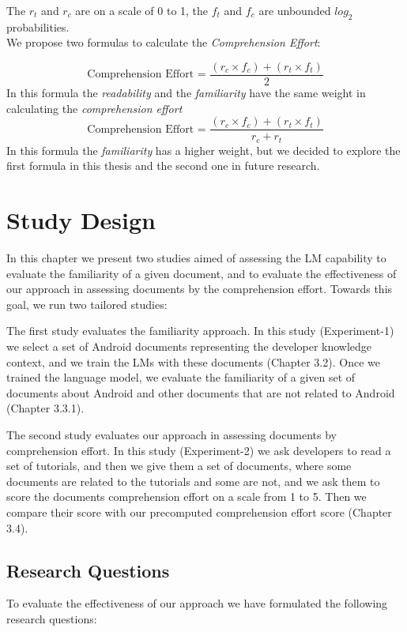 \documentclass[12pt,mscthesis]{usiinfthesis}
\begin{document}
 The $r_{t}$  and $r_{c}$ are on a scale of 0 to 1,  the $f_{t}$  and $f_{c}$ are unbounded $log_{2}$ probabilities.\\
 We propose two formulas to calculate the \emph{Comprehension Effort}:

 \[\text{Comprehension Effort = }\frac{(r_{c}\times f_{c}) + (r_{t} \times f_{t})}{2} \]
 In this formula the \emph{readability} and the \emph{familiarity} have the same weight in calculating the \emph{comprehension effort}
 \[\text{Comprehension Effort = }\frac{(r_{c}\times f_{c}) + (r_{t} \times f_{t})}{r_c+r_t} \]
 In this formula the \emph{familiarity} has a higher weight, but we decided to explore the first formula in this thesis and the second one in future research.
	
\chapter{Study Design}

	In this chapter we present two studies aimed of assessing the LM capability to evaluate the familiarity of a given document, and to evaluate the effectiveness of our approach in assessing documents by the comprehension effort. Towards this goal, we run two tailored studies:
	

	The first study evaluates the familiarity approach. In this study (Experiment-1) we select a set of Android documents representing the developer knowledge context, and we train the LMs with these documents (Chapter 3.2). Once we trained the language model, we evaluate the familiarity of a given set of documents about Android and other documents that are not related to Android (Chapter 3.3.1). 
		

	 The second study evaluates our approach in assessing documents by comprehension effort. In this study (Experiment-2) we ask developers to read a set of tutorials, and then we give them a set of documents, where some documents are related to the tutorials and some are not, and we ask them to score the documents comprehension effort on a scale from 1 to 5. Then we compare their score with our precomputed comprehension effort score (Chapter 3.4).


	\section{Research Questions}
	To evaluate the effectiveness of our approach we have formulated the following research questions:
	\newpage
\end{document}
